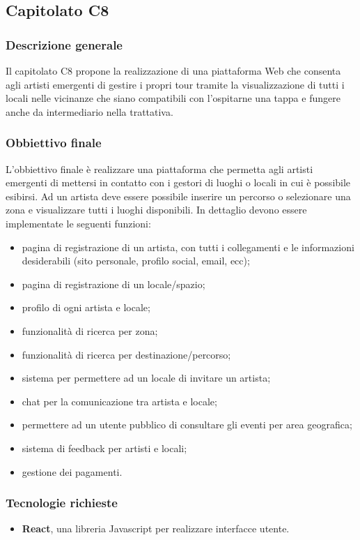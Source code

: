 \subsection{Capitolato C8}

\subsubsection{Descrizione generale}
Il capitolato C8 propone la realizzazione di una piattaforma Web che consenta agli artisti emergenti di gestire i propri tour
tramite la visualizzazione di tutti i locali nelle vicinanze che siano compatibili con l'ospitarne una tappa e fungere anche da intermediario nella trattativa.

\subsubsection{Obbiettivo finale}
L'obbiettivo finale è realizzare una piattaforma che permetta agli artisti emergenti di mettersi in contatto con i gestori di luoghi o locali in cui è possibile esibirsi.
Ad un artista deve essere possibile inserire un percorso o selezionare una zona e visualizzare tutti i luoghi disponibili.
In dettaglio devono essere implementate le seguenti funzioni:
\begin{itemize}
\item pagina di registrazione di un artista, con tutti i collegamenti e le informazioni desiderabili (sito personale, profilo social, email, ecc);
\item pagina di registrazione di un locale/spazio;
\item profilo di ogni artista e locale;
\item funzionalità di ricerca per zona;
\item funzionalità di ricerca per destinazione/percorso;
\item sistema per permettere ad un locale di invitare un artista;
\item chat per la comunicazione tra artista e locale;
\item permettere ad un utente pubblico di consultare gli eventi per area geografica;
\item sistema di feedback per artisti e locali;
\item gestione dei pagamenti.
\end{itemize}

\subsubsection{Tecnologie richieste}
\begin{itemize}
\item \textbf{React}, una libreria Javascript per realizzare interfacce utente.
\end{itemize}


